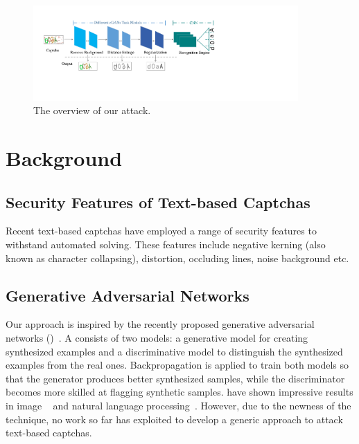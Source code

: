 \begin{figure}[!t]
  \centering
  \includegraphics[width=0.9\textwidth]{fig/overview/overview.pdf}
  \caption{The overview of our attack.}
  \label{fig:overview}
\end{figure}

\section{Background}
\subsection{Security Features of Text-based Captchas}
Recent text-based captchas have employed a range of security features to withstand automated solving. These features include negative
kerning (also known as character collapsing), distortion, occluding lines, noise background etc.


\subsection{Generative Adversarial Networks}
Our approach is inspired by the recently proposed generative adversarial networks (\GANs)~\cite{Goodfellow2014Generative}. A \GAN consists
of two models: a generative model for creating synthesized examples and a discriminative model to distinguish the synthesized examples from
the real ones. Backpropagation is applied to train both models so that the generator produces better synthesized samples, while the
discriminator becomes more skilled at flagging synthetic samples. \GANs have shown impressive results in image
~\cite{pix2pix2016,CycleGAN2017} and natural language processing~\cite{Yu2016SeqGAN,Li2017Adversarial}. However, due to the newness of the
technique, no work so far has exploited \GANs to develop a generic approach to attack text-based captchas.

